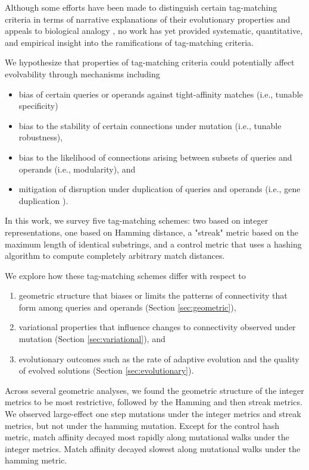 Although some efforts have been made to distinguish certain tag-matching criteria in terms of narrative explanations of their evolutionary properties and appeals to biological analogy \citep{downing2015intelligence,scherer2004activation}, no work has yet provided systematic, quantitative, and empirical insight into the ramifications of tag-matching criteria.

We hypothesize that properties of tag-matching criteria could potentially affect evolvability through mechanisms including
\begin{itemize}
  \item bias of certain queries or operands against tight-affinity matches (i.e., tunable specificity)
  \item bias to the stability of certain connections under mutation (i.e., tunable robustness),
  \item bias to the likelihood of connections arising between subsets of queries and operands (i.e., modularity), and
  \item mitigation of disruption under duplication of queries and operands (i.e., gene duplication \citep{ohno2013evolution, lewis1978gene}).
\end{itemize}

In this work, we survey five tag-matching schemes: two based on integer representations, one based on Hamming distance, a "streak" metric based on the maximum length of identical substrings, and a control metric that uses a hashing algorithm to compute completely arbitrary match distances.

We explore how these tag-matching schemes differ with respect to
\begin{enumerate}
  \item geometric structure that biases or limits the patterns of connectivity that form among queries and operands (Section \ref{sec:geometric}),
  \item variational properties that influence changes to connectivity observed under mutation (Section \ref{sec:variational}), and
  \item evolutionary outcomes such as the rate of adaptive evolution and the quality of evolved solutions (Section \ref{sec:evolutionary}).
\end{enumerate}

Across several geometric analyses, we found the geometric structure of the integer metrics to be most restrictive, followed by the Hamming and then streak metrics.
We observed large-effect one step mutations under the integer metrics and streak metrics, but not under the hamming mutation.
Except for the control hash metric, match affinity decayed most rapidly along mutational walks under the integer metrics.
Match affinity decayed slowest along mutational walks under the hamming metric.

